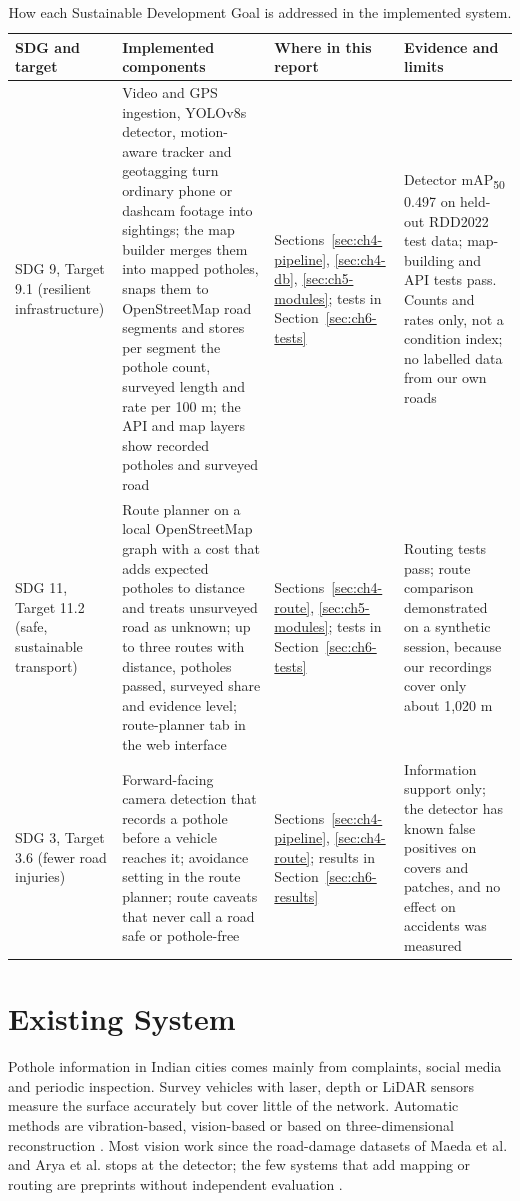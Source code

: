 \begin{table}[!htbp]
\centering
\small
\renewcommand{\arraystretch}{1.2}
\begin{tabular}{|L{2.0cm}|L{4.9cm}|L{2.3cm}|L{3.6cm}|}
\hline
\textbf{SDG and target} & \textbf{Implemented components} & \textbf{Where in this report} & \textbf{Evidence and limits} \\
\hline
SDG 9, Target 9.1 (resilient infrastructure) & Video and GPS ingestion, YOLOv8s detector, motion-aware tracker and geotagging turn ordinary phone or dashcam footage into sightings; the map builder merges them into mapped potholes, snaps them to OpenStreetMap road segments and stores per segment the pothole count, surveyed length and rate per 100 m; the API and map layers show recorded potholes and surveyed road & Sections~\ref{sec:ch4-pipeline}, \ref{sec:ch4-db}, \ref{sec:ch5-modules}; tests in Section~\ref{sec:ch6-tests} & Detector mAP\textsubscript{50} 0.497 on held-out RDD2022 test data; map-building and API tests pass. Counts and rates only, not a condition index; no labelled data from our own roads \\
\hline
SDG 11, Target 11.2 (safe, sustainable transport) & Route planner on a local OpenStreetMap graph with a cost that adds expected potholes to distance and treats unsurveyed road as unknown; up to three routes with distance, potholes passed, surveyed share and evidence level; route-planner tab in the web interface & Sections~\ref{sec:ch4-route}, \ref{sec:ch5-modules}; tests in Section~\ref{sec:ch6-tests} & Routing tests pass; route comparison demonstrated on a synthetic session, because our recordings cover only about 1,020 m \\
\hline
SDG 3, Target 3.6 (fewer road injuries) & Forward-facing camera detection that records a pothole before a vehicle reaches it; avoidance setting in the route planner; route caveats that never call a road safe or pothole-free & Sections~\ref{sec:ch4-pipeline}, \ref{sec:ch4-route}; results in Section~\ref{sec:ch6-results} & Information support only; the detector has known false positives on covers and patches, and no effect on accidents was measured \\
\hline
\end{tabular}
\caption{How each Sustainable Development Goal is addressed in the implemented system.}
\label{tab:ch1-sdg}
\end{table}

\section{Existing System}
Pothole information in Indian cities comes mainly from complaints, social media and periodic inspection. Survey vehicles with laser, depth or LiDAR sensors measure the surface accurately \cite{ma2022review,kang2017pothole} but cover little of the network. Automatic methods are vibration-based, vision-based or based on three-dimensional reconstruction \cite{kim2022review,ma2022review}. Most vision work since the road-damage datasets of Maeda et al. and Arya et al. \cite{maeda2018road,arya2022rdd2022} stops at the detector; the few systems that add mapping or routing are preprints without independent evaluation \cite{sahoo2025iwatchroadv2,balakuntala2013pothole}.

